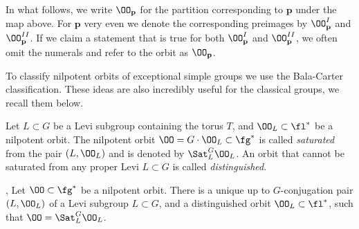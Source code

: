 \documentclass[12pt]{amsart}
\begin{document}
    In what follows, we write $\OO_\mathbf{p}$ for the partition corresponding to $\mathbf{p}$ under the map above. For $\mathbf{p}$ very even we denote the corresponding preimages by $\OO_\mathbf{p}^I$ and $\OO_\mathbf{p}^{II}$. If we claim a statement that is true for both $\OO_\mathbf{p}^I$ and $\OO_\mathbf{p}^{II}$, we often omit the numerals and refer to the orbit as $\OO_\mathbf{p}$.

    To classify nilpotent orbits of exceptional simple groups we use the Bala-Carter classification. These ideas are also incredibly useful for the classical groups, we recall them below. 

    Let $L\subset G$ be a Levi subgroup containing the torus $T$, and $\OO_L\subset \fl^*$ be a nilpotent orbit. The nilpotent orbit $\OO=G\cdot \OO_L\subset \fg^*$ is called \emph{saturated} from the pair $(L, \OO_L)$ and is denoted by $\Sat_L^G \OO_L$. An orbit that cannot be saturated from any proper Levi $L\subset G$ is called \emph{distinguished}. 
    \begin{prop}\label{BC saturation} \cite{BalaCarter1976}, \cite[Thm. 8.1.1]{CM}
        Let $\OO\subset \fg^*$ be a nilpotent orbit. There is a unique up to $G$-conjugation pair $(L, \OO_L)$ of a Levi subgroup $L\subset G$, and a distinguished orbit $\OO_L\subset \fl^*$, such that $\OO=\Sat_L^G \OO_L$.
    \end{prop}





\end{document}
